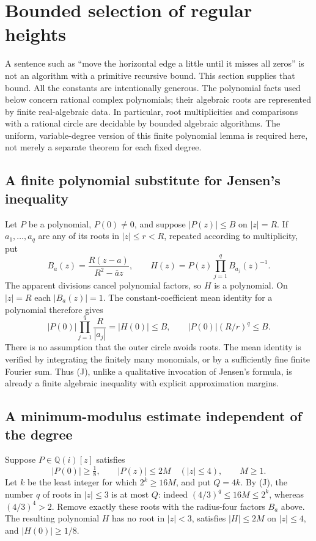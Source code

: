 \section{Bounded selection of regular heights}
\label{sec:regular-heights}

A sentence such as ``move the horizontal edge a little until it misses all
zeros'' is not an algorithm with a primitive recursive bound.  This section
supplies that bound.  All the constants are intentionally generous.
The polynomial facts used below concern rational complex polynomials; their
algebraic roots are represented by finite real-algebraic data.  In particular,
root multiplicities and comparisons with a rational circle are decidable by
bounded algebraic algorithms.  The uniform, variable-degree version of this
finite polynomial lemma is required here, not merely a separate theorem for
each fixed degree.

\subsection{A finite polynomial substitute for Jensen's inequality}

Let $P$ be a polynomial, $P(0)\ne0$, and suppose $|P(z)|\le B$ on
$|z|=R$.  If $a_1,\ldots,a_q$ are any of its roots in $|z|\le r<R$,
repeated according to multiplicity, put
\[
 B_a(z)=\frac{R(z-a)}{R^2-\overline a z},\qquad
 H(z)=P(z)\prod_{j=1}^q B_{a_j}(z)^{-1}.
\]
The apparent divisions cancel polynomial factors, so $H$ is a polynomial.
On $|z|=R$ each $|B_a(z)|=1$.  The constant-coefficient mean identity for a
polynomial therefore gives
\[
 |P(0)|\prod_{j=1}^q\frac R{|a_j|}=|H(0)|\le B,
 \qquad
 |P(0)|(R/r)^q\le B.                         \tag{J}
\]
There is no assumption that the outer circle avoids roots.  The mean identity
is verified by integrating the finitely many monomials, or by a sufficiently
fine finite Fourier sum.  Thus (J), unlike a qualitative invocation of
Jensen's formula, is already a finite algebraic inequality with explicit
approximation margins.

\subsection{A minimum-modulus estimate independent of the degree}

Suppose $P\in\mathbb Q(i)[z]$ satisfies
\[
 |P(0)|\ge\tfrac18,\qquad |P(z)|\le2M\quad(|z|\le4),\qquad M\ge1.
\]
Let $k$ be the least integer for which $2^k\ge16M$, and put $Q=4k$.
By (J), the number $q$ of roots in $|z|\le3$ is at most $Q$:
indeed $(4/3)^q\le16M\le2^k$, whereas $(4/3)^4>2$.
Remove exactly these roots with the radius-four factors $B_a$ above.
The resulting polynomial $H$ has no root in $|z|<3$, satisfies
$|H|\le2M$ on $|z|\le4$, and $|H(0)|\ge1/8$.

